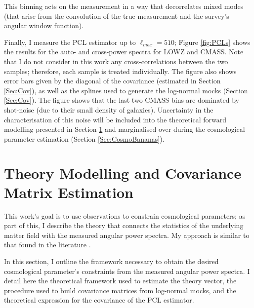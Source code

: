 
\noindent This binning acts on the measurement in a way that decorrelates mixed modes (that arise from the convolution of the true measurement and the survey's angular window function). 

\qquad Finally, I measure the PCL estimator up to $\ell_{max} = 510$; Figure \ref{fig:PCLs} shows the results for the auto- and cross-power spectra for LOWZ and CMASS. Note that I do not consider in this work any cross-correlations between the two samples; therefore, each sample is treated individually. The figure also shows error bars given by the diagonal of the covariance (estimated in Section \ref{Sec:Cov}), as well as the splines used to generate the log-normal mocks (Section \ref{Sec:Cov}). The figure shows that the last two CMASS bins are dominated by shot-noise (due to their small density of galaxies). Uncertainty in the characterisation of this noise will be included into the theoretical forward modelling presented in Section \ref{Sec:Theory} and marginalised over during the cosmological parameter estimation (Section \ref{Sec:CosmoBananas}).



\section{Theory Modelling and Covariance Matrix Estimation}\label{Sec:Theory}
This work's goal is to use observations to constrain cosmological parameters; as part of this, I describe the theory that connects the statistics of the underlying matter field with the measured angular power spectra. My approach is similar to that found in the literature \citep{ScharfLahav1992,2001Huterer,Padm2007,Thomas2011,Asorey2012}.

\qquad In this section, I outline the framework necessary to obtain the desired cosmological parameter's constraints from the measured angular power spectra.  I detail here the theoretical framework used to estimate the theory vector, the procedure used to build covariance matrices from log-normal mocks, and the theoretical expression for the covariance of the PCL estimator.

